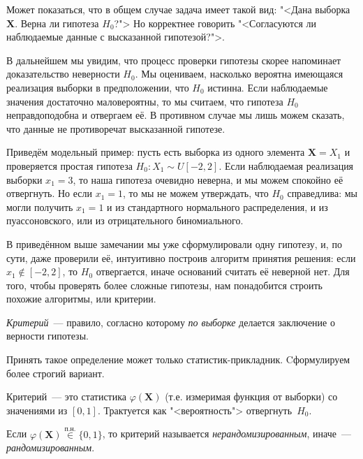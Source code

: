 \begin{rmrk}
    Может показаться, что в общем случае задача имеет такой вид:
    "<Дана выборка $\mathbf{X}$. Верна ли гипотеза $H_0$?">
    Но корректнее говорить "<Согласуются ли наблюдаемые данные с высказанной гипотезой?">.

    В дальнейшем мы увидим, что процесс проверки гипотезы скорее напоминает доказательство неверности $H_0$.
    Мы оцениваем, насколько вероятна имеющаяся реализация выборки в предположении, что $H_0$ истинна.
    Если наблюдаемые значения достаточно маловероятны, то мы считаем, что гипотеза $H_0$ неправдоподобна и отвергаем её.
    В противном случае мы лишь можем сказать, что данные не противоречат высказанной гипотезе.
    
    Приведём модельный пример: пусть есть выборка из одного элемента $\mathbf{X} = X_1$ и проверяется простая гипотеза $H_0\colon X_1 \sim U[-2, 2]$.
    Если наблюдаемая реализация выборки $x_1 = 3$, то наша гипотеза очевидно неверна, и мы можем спокойно её отвергнуть.
    Но если $x_1 = 1$, то мы не можем утверждать, что $H_0$ справедлива: 
    мы могли получить $x_1 = 1$ и из стандартного нормального распределения, и из пуассоновского, или из отрицательного биномиального.
\end{rmrk}

\medskip
В приведённом выше замечании мы уже сформулировали одну гипотезу, и, по сути, даже проверили её, 
интуитивно построив алгоритм принятия решения: если $x_1 \notin [-2, 2]$, то $H_0$ отвергается, иначе оснований считать её неверной нет.
Для того, чтобы проверять более сложные гипотезы, нам понадобится строить похожие алгоритмы, или критерии.

\begin{defn}
    \textit{Критерий}~--- правило, согласно которому \textit{по выборке} делается заключение о верности гипотезы.
\end{defn}

Принять такое определение может только статистик-прикладник.
Cформулируем более строгий вариант.

\begin{defn}
    Критерий~--- это статистика $\varphi(\mathbf{X})$ (т.е. измеримая функция от выборки) со значениями из $[0, 1]$. 
    Трактуется как "<вероятность"> отвергнуть~$H_0$.
    
    Если $\varphi(\mathbf{X}) \overset{\text{п.н.}}{\in} \{0, 1\}$, 
    то критерий называется \textit{нерандомизированным}, иначе~--- \textit{рандомизированным}.
\end{defn}

